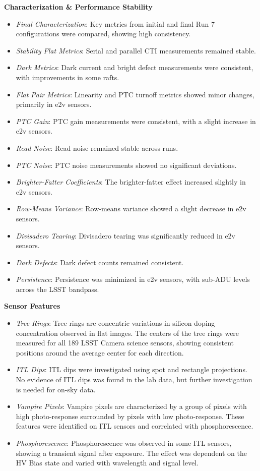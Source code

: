\textbf{Characterization \& Performance Stability} \\
\begin{itemize}
    \item \textit{Final Characterization}: Key metrics from initial and final Run 7 configurations were compared, showing high consistency.
    \item \textit{Stability Flat Metrics}: Serial and parallel CTI measurements remained stable.
    \item \textit{Dark Metrics}: Dark current and bright defect measurements were consistent, with improvements in some rafts.
    \item \textit{Flat Pair Metrics}: Linearity and PTC turnoff metrics showed minor changes, primarily in e2v sensors.
    \item \textit{PTC Gain}: PTC gain measurements were consistent, with a slight increase in e2v sensors.
    \item \textit{Read Noise}: Read noise remained stable across runs.
    \item \textit{PTC Noise}: PTC noise measurements showed no significant deviations.
    \item \textit{Brighter-Fatter Coefficients}: The brighter-fatter effect increased slightly in e2v sensors.
    \item \textit{Row-Means Variance}: Row-means variance showed a slight decrease in e2v sensors.
    \item \textit{Divisadero Tearing}: Divisadero tearing was significantly reduced in e2v sensors.
    \item \textit{Dark Defects}: Dark defect counts remained consistent.
    \item \textit{Persistence}: Persistence was minimized in e2v sensors, with sub-ADU levels across the LSST bandpass.
\end{itemize}

\textbf{Sensor Features} \\
\begin{itemize}
    \item \textit{Tree Rings}: Tree rings are concentric variations in silicon doping concentration observed in flat images. The centers of the tree rings were measured for all 189 LSST Camera science sensors, showing consistent positions around the average center for each direction.
    \item \textit{ITL Dips}: ITL dips were investigated using spot and rectangle projections. No evidence of ITL dips was found in the lab data, but further investigation is needed for on-sky data.
    \item \textit{Vampire Pixels}: Vampire pixels are characterized by a group of pixels with high photo-response surrounded by pixels with low photo-response. These features were identified on ITL sensors and correlated with phosphorescence.
    \item \textit{Phosphorescence}: Phosphorescence was observed in some ITL sensors, showing a transient signal after exposure. The effect was dependent on the HV Bias state and varied with wavelength and signal level.
\end{itemize}

